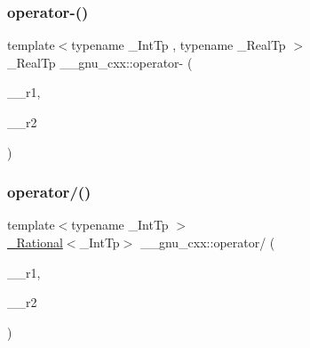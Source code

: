 \subsubsection{\texorpdfstring{operator-\/()}{operator-()}\hspace{0.1cm}{\footnotesize\ttfamily [4/4]}}
{\footnotesize\ttfamily template$<$typename \+\_\+\+Int\+Tp , typename \+\_\+\+Real\+Tp $>$ \\
\+\_\+\+Real\+Tp \+\_\+\+\_\+gnu\+\_\+cxx\+::operator-\/ (\begin{DoxyParamCaption}\item[{const \hyperlink{class____gnu__cxx_1_1__Rational}{\+\_\+\+Rational}$<$ \+\_\+\+Int\+Tp $>$ \&}]{\+\_\+\+\_\+r1,  }\item[{\+\_\+\+Real\+Tp}]{\+\_\+\+\_\+r2 }\end{DoxyParamCaption})}

\mbox{\label{namespace____gnu__cxx_a67264d9df2f676cda11c7a3ab8f92bf1}} 
\subsubsection{\texorpdfstring{operator/()}{operator/()}\hspace{0.1cm}{\footnotesize\ttfamily [1/3]}}
{\footnotesize\ttfamily template$<$typename \+\_\+\+Int\+Tp $>$ \\
\hyperlink{class____gnu__cxx_1_1__Rational}{\+\_\+\+Rational}$<$\+\_\+\+Int\+Tp$>$ \+\_\+\+\_\+gnu\+\_\+cxx\+::operator/ (\begin{DoxyParamCaption}\item[{const \hyperlink{class____gnu__cxx_1_1__Rational}{\+\_\+\+Rational}$<$ \+\_\+\+Int\+Tp $>$ \&}]{\+\_\+\+\_\+r1,  }\item[{const \hyperlink{class____gnu__cxx_1_1__Rational}{\+\_\+\+Rational}$<$ \+\_\+\+Int\+Tp $>$ \&}]{\+\_\+\+\_\+r2 }\end{DoxyParamCaption})}

\mbox{\label{namespace____gnu__cxx_abc432e82150d2e400ec89b3a203f6671}} 
